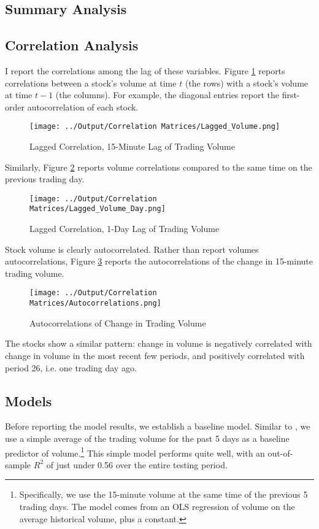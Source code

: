 \documentclass[12pt]{article}
\begin{document}
\subsection{Summary Analysis}
\subsection{Correlation Analysis}
I report the correlations among the lag of these variables. Figure \ref{fig:lagged_volume} reports correlations between a stock's volume at time $t$ (the rows) with a stock's volume at time $t-1$ (the columns). For example, the diagonal entries report the first-order autocorrelation of each stock.

\begin{figure}[H]
    \centering
    \caption{Lagged Correlation, 15-Minute Lag of Trading Volume}
    \texttt{[image: ../Output/Correlation Matrices/Lagged\_Volume.png]}
    \label{fig:lagged_volume}
\end{figure}

Similarly, Figure \ref{fig:lagged_volume_day} reports volume correlations compared to the same time on the previous trading day.

\begin{figure}[H]
    \centering
    \caption{Lagged Correlation, 1-Day Lag of Trading Volume}
    \texttt{[image: ../Output/Correlation Matrices/Lagged\_Volume\_Day.png]}
    \label{fig:lagged_volume_day}
\end{figure}

Stock volume is clearly autocorrelated. Rather than report volumes autocorrelations, Figure \ref{fig:autocorrelations} reports the autocorrelations of the change in 15-minute trading volume. 

\begin{figure}[H]
    \centering
    \caption{Autocorrelations of Change in Trading Volume}
    \texttt{[image: ../Output/Correlation Matrices/Autocorrelations.png]}
    \label{fig:autocorrelations}
\end{figure}

The stocks show a similar pattern: change in volume is negatively correlated with change in volume in the most recent few periods, and positively correlated with period 26, i.e. one trading day ago.

\subsection{Models}
Before reporting the model results, we establish a baseline model. Similar to \textcite{goyenko2024trading}, we use a simple average of the trading volume for the past 5 days as a baseline predictor of volume.\footnote{Specifically, we use the 15-minute volume at the same time of the previous 5 trading days. The model comes from an OLS regression of volume on the average historical volume, plus a constant.} This simple model performs quite well, with an out-of-sample $R^2$ of just under 0.56 over the entire testing period.
\end{document}
